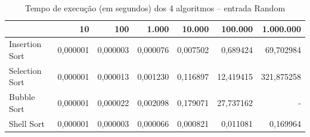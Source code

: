 \begin{table}[htbp]
    \centering
    \begin{tabular}{|l|r|r|r|r|r|r|}
        \hline
         & 10 & 100 & 1.000 & 10.000 & 100.000 & 1.000.000 \\
        \hline
        Insertion Sort & 0,000001 & 0,000003 & 0,000076 & 0,007502 & 0,689424 & 69,702984 \\
        \hline
        Selection Sort & 0,000001 & 0,000013 & 0,001230 & 0,116897 & 12,419415 & 321,875258 \\
        \hline
        Bubble Sort & 0,000001 & 0,000022 & 0,002098 & 0,179071 & 27,737162 & - \\
        \hline
        Shell Sort & 0,000001 & 0,000003 & 0,000066 & 0,000821 & 0,011081 & 0,169964 \\
        \hline
    \end{tabular}
    \caption{Tempo de execução (em segundos) dos 4 algoritmos -- entrada Random}
    \label{tab:comparacao_random}
\end{table}


